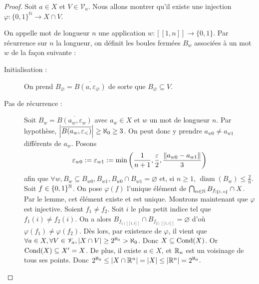 \begin{proof}
Soit $a\in X$ et $V\in\mathscr V_a$.
 Nous allons montrer qu'il existe une injection $\varphi : \{0,1\}^{\mathbb N}\to X\cap V$.
 
On appelle mot de longueur $n$ une application $w : [\![1,n]\!]\to \{0,1\}$. Par récurrence sur $n$ la longueur, on définit les boules fermées $B_w$ associées à un mot $w$ de la façon suivante :
\begin{description}
    \item[Initialisation : ] On prend $B_{\varnothing} = \overline{B(a,\varepsilon_{\varnothing})}$ de sorte que $B_{\varnothing}\subseteq V$.
    \item[Pas de récurrence : ] Soit $B_w = \overline{B(a_w,\varepsilon_w)}$ avec $a_w\in X$ et $w$ un mot de longueur $n$. Par hypothèse, $\left| \overline{B(a_w,\varepsilon_<)} \right|\ge\aleph_0\ge 3$. On peut donc y prendre $a_{w0}\ne a_{w1}$ différents de $a_w$. Posons $$\varepsilon_{w0}:=\varepsilon_{w1}:=\min\left(\frac{1}{n+1}, \frac{\varepsilon}{2}, \frac{\left\| a_{w0} - a_{w1} \right\|}{3}\right)$$ afin que $\forall w, B_w\subseteq B_{w0},B_{w1}, B_{w0}\cap B_{w1} = \varnothing$ et, si $n\ge 1$, $\operatorname{diam}(B_w)\le \frac 2n$.
    Soit $f\in \{0,1\}^{\mathbb{N}}$. On pose $\varphi(f)$ l'unique élément de $\bigcap_{n\in\mathbb{N}}B_{f_{\mid[\![1,n]\!]}}\cap X$. Par le lemme, cet élément existe et est unique. Montrons maintenant que $\varphi$ est injective. Soient $f_1\ne f_2$. Soit $i$ le plus petit indice tel que $f_1(i)\ne f_2(i)$. On a alors $B_{f_{1\mid[\![1,i]\!]}}\cap B_{f_{2\mid[\![1,i]\!]}} = \varnothing$ d'où $\varphi(f_1)\ne\varphi(f_2)$.
Dès lors, par existence de $\varphi$, il vient que $\forall a\in X, \forall V\in\mathscr V _a, \left| X\cap V \right|\ge 2^{\aleph_0}>\aleph_0$. Donc $X\subseteq\operatorname{Cond}(X)$. Or $\operatorname{Cond}(X)\subseteq X' = X$. De plus, il existe $a\in X$, et $\mathbb{R}_n$ est un voisinage de tous ses points. Donc $2^{\aleph_0}\le \left| X\cap \mathbb{R}^n \right| = \left| X \right|\le \left| \mathbb{R}^n \right| = 2^{\aleph_0}$.
\end{description}
  
\end{proof}

